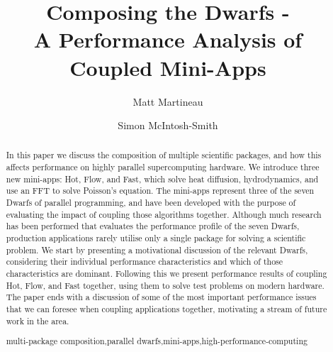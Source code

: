 \documentclass[runningheads,a4paper]{llncs}
\newcommand{\keywords}[1]{\par\addvspace\baselineskip
\noindent\keywordname\enspace\ignorespaces#1}
\begin{document}
\mainmatter  %

\title{Composing the Dwarfs - \\A Performance Analysis of Coupled Mini-Apps}


\author{Matt Martineau \and Simon McIntosh-Smith}
%


%
%

\maketitle


\begin{abstract}
  In this paper we discuss the composition of multiple scientific packages, and how this affects performance on highly parallel supercomputing hardware. We introduce three new mini-apps: Hot, Flow, and Fast, which solve heat diffusion, hydrodynamics, and use an FFT to solve Poisson's equation. The mini-apps represent three of the seven Dwarfs of parallel programming, and have been developed with the purpose of evaluating the impact of coupling those algorithms together. Although much research has been performed that evaluates the performance profile of the seven Dwarfs, production applications rarely utilise only a single package for solving a scientific problem. We start by presenting a motivational discussion of the relevant Dwarfs, considering their individual performance characteristics and which of those characteristics are dominant. Following this we present performance results of coupling Hot, Flow, and Fast together, using them to solve test problems on modern hardware. The paper ends with a discussion of some of the most important performance issues that we can foresee when coupling applications together, motivating a stream of future work in the area.

  \keywords{multi-package composition,parallel dwarfs,mini-apps,high-performance-computing}
\end{abstract}
\end{document}
